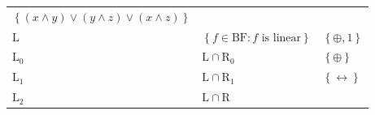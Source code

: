\documentclass[10pt,a4paper]{article}
\newcommand{\set}[1]{\left\{#1\right\}}
\newcommand{\xor}{\oplus}
\newcommand{\clonefont}[1]{\mathrm{#1}}
\begin{document}
\begin{figure}[hbtp]
\begin{small}
\begin{longtable}[]{p{}p{}p{}}
\begin{minipage}[t]{0.38\columnwidth}
                \(\set{(x \land y) \lor (y \land {z}) \lor (x \land {z})}\)\strut
            \end{minipage}\tabularnewline
            \begin{minipage}[t]{0.12\columnwidth}\raggedright
                \(\clonefont{L}\)\strut
            \end{minipage} & \begin{minipage}[t]{0.41\columnwidth}\raggedright
                \(\set{f \in \clonefont{BF} : f \text{ is linear}}\)\strut
            \end{minipage} & \begin{minipage}[t]{0.38\columnwidth}\raggedright
                \(\set{\xor, 1}\)\strut
            \end{minipage}\tabularnewline
            \begin{minipage}[t]{0.12\columnwidth}\raggedright
                \(\clonefont{L_0}\)\strut
            \end{minipage} & \begin{minipage}[t]{0.41\columnwidth}\raggedright
                \(\clonefont{L} \cap \clonefont{R_0}\)\strut
            \end{minipage} & \begin{minipage}[t]{0.38\columnwidth}\raggedright
                \(\set{\xor}\)\strut
            \end{minipage}\tabularnewline
            \begin{minipage}[t]{0.12\columnwidth}\raggedright
                \(\clonefont{L_1}\)\strut
            \end{minipage} & \begin{minipage}[t]{0.41\columnwidth}\raggedright
                \(\clonefont{L} \cap \clonefont{R_1}\)\strut
            \end{minipage} & \begin{minipage}[t]{0.38\columnwidth}\raggedright
                \(\set{\leftrightarrow}\)\strut
            \end{minipage}\tabularnewline
            \begin{minipage}[t]{0.12\columnwidth}\raggedright
                \(\clonefont{L_2}\)\strut
            \end{minipage} & \begin{minipage}[t]{0.41\columnwidth}\raggedright
                \(\clonefont{L} \cap \clonefont{R}\)\strut
            \end{minipage} & \begin{minipage}[t]{0.38\columnwidth}\raggedright

\end{minipage}
\end{longtable}
\end{small}
\end{figure}
\end{document}

